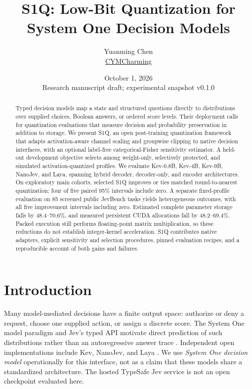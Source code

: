 \documentclass[10pt,twocolumn]{article}
\title{\vspace{-0.6cm}\textbf{S1Q: Low-Bit Quantization for\\System One Decision Models}}
\author{Yuanming Chen\\\small \href{https://github.com/CYMCharming}{CYMCharming}}
\date{\small October 1, 2026\\\footnotesize Research manuscript draft; experimental snapshot v0.1.0}
\begin{document}
\maketitle
\begin{abstract}
Typed decision models map a state and structured questions directly to
distributions over supplied choices, Boolean answers, or ordered score levels.
Their deployment calls for quantization evaluations that measure decision
and probability preservation in addition to storage.
We present S1Q, an open post-training quantization framework that adapts
activation-aware channel scaling and groupwise clipping to native decision
interfaces, with an optional label-free categorical-Fisher sensitivity
estimator. A held-out development objective selects among weight-only,
selectively protected, and simulated activation-quantized profiles.
We evaluate Kev-0.8B, Kev-4B, Kev-9B, NanoJev, and Laya, spanning hybrid
decoder, decoder-only, and encoder architectures. On exploratory main cohorts,
selected S1Q improves or ties matched round-to-nearest quantization; four of
five paired 95\% intervals include zero. A separate fixed-profile evaluation
on 85 screened public JevBench tasks yields heterogeneous outcomes, with all
five improvement intervals including zero. Estimated complete parameter
storage falls by 48.4--70.6\%, and measured persistent CUDA allocations fall
by 48.2--69.4\%. Packed execution still performs floating-point matrix
multiplication, so these reductions do not establish integer-kernel
acceleration. S1Q contributes native adapters, explicit sensitivity and
selection procedures, pinned evaluation recipes, and a reproducible account
of both gains and failures.
\end{abstract}

\section{Introduction}
Many model-mediated decisions have a finite output space: authorize or deny
a request, choose one supplied action, or assign a discrete score.
The System One model paradigm and Jev's typed API motivate direct prediction
of such distributions rather than an autoregressive answer trace
\cite{typesafe2026jev}. Independent open implementations include Kev,
NanoJev, and Laya \cite{palmer2026kev,tianyu2026nanojev,kishor2026laya}.
We use \emph{System One decision model} operationally for this interface,
not as a claim that these models share a standardized architecture.
The hosted TypeSafe Jev service is not an open checkpoint evaluated here.
\end{document}
